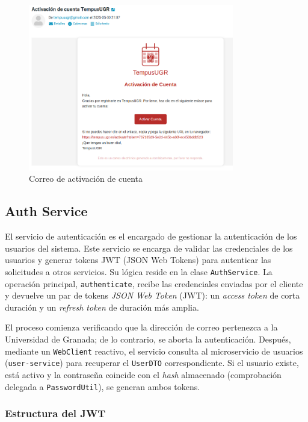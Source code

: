 \begin{figure}[H]
    \centering
    \includegraphics[width=0.8\textwidth]{figures/07_email.png}
    \caption{Correo de activación de cuenta}
    \label{fig:mail-service-class-diagram}
\end{figure}

\subsection{Auth Service}
El servicio de autenticación es el encargado de gestionar la autenticación de los usuarios del sistema. Este servicio se encarga de validar las credenciales de los usuarios y generar tokens JWT (JSON Web Tokens) para autenticar las solicitudes a otros servicios.
\newline\newline
Su lógica reside en la clase \texttt{AuthService}. 
La operación principal, \texttt{authenticate}, recibe las credenciales enviadas por el cliente y devuelve un par de tokens
\emph{JSON Web Token} (JWT): un \emph{access token} de corta duración y un \emph{refresh token} de duración más amplia. 

El proceso comienza verificando que la dirección de correo pertenezca a la Universidad de Granada; 
de lo contrario, se aborta la autenticación.  
Después, mediante un \texttt{WebClient} reactivo, el servicio consulta al microservicio de usuarios 
(\texttt{user-service}) para recuperar el \texttt{UserDTO} correspondiente.  
Si el usuario existe, está activo y la contraseña coincide con el \emph{hash} almacenado (comprobación
delegada a \texttt{PasswordUtil}), se generan ambos tokens.

\subsubsection*{Estructura del JWT}

